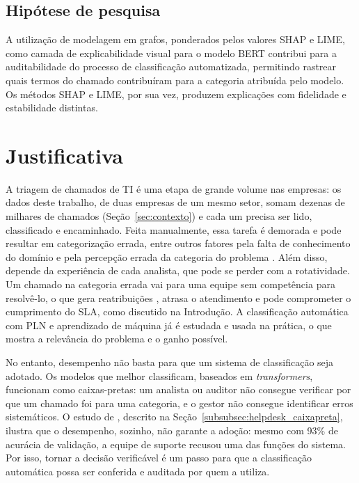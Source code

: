 \documentclass[
    12pt,                %
    openright,           %
    oneside,             %
    a4paper,             %
    english,             %
    brazil               %
]{abntex2}
\begin{document}
\subsection{Hipótese de pesquisa}
\label{sec:hipotese_pesquisa}

A utilização de modelagem em grafos, ponderados pelos valores SHAP e LIME, 
como camada de explicabilidade visual para o modelo BERT contribui para a 
auditabilidade do processo de classificação automatizada, permitindo rastrear 
quais termos do chamado contribuíram para a categoria atribuída pelo modelo. 
Os métodos SHAP e LIME, por sua vez, produzem explicações com fidelidade e estabilidade distintas.

\section{Justificativa}
\label{sec:justificativa}

A triagem de chamados de TI é uma etapa de grande volume nas empresas: os dados deste trabalho, de duas empresas de um mesmo setor, somam dezenas de milhares de chamados (Seção~\ref{sec:contexto}) e cada um precisa ser lido, classificado e encaminhado. Feita manualmente, essa tarefa é demorada e pode resultar em categorização errada, entre outros fatores pela falta de conhecimento do domínio e pela percepção errada da categoria do problema \cite{paramesh2022}. Além disso, depende da experiência de cada analista, que pode se perder com a rotatividade. Um chamado na categoria errada vai para uma equipe sem competência para resolvê-lo, o que gera reatribuições \cite{paramesh2022}, atrasa o atendimento e pode comprometer o cumprimento do SLA, como discutido na Introdução. A classificação automática com PLN e aprendizado de máquina já é estudada e usada na prática, o que mostra a relevância do problema e o ganho possível.

No entanto, desempenho não basta para que um sistema de classificação seja adotado. Os modelos que melhor classificam, baseados em \textit{transformers}, funcionam como caixas-pretas: um analista ou auditor não consegue verificar por que um chamado foi para uma categoria, e o gestor não consegue identificar erros sistemáticos. O estudo de , descrito na Seção~\ref{subsubsec:helpdesk_caixapreta}, ilustra que o desempenho, sozinho, não garante a adoção: mesmo com 93\% de acurácia de validação, a equipe de suporte recusou uma das funções do sistema. Por isso, tornar a decisão verificável é um passo para que a classificação automática possa ser conferida e auditada por quem a utiliza.
\end{document}
